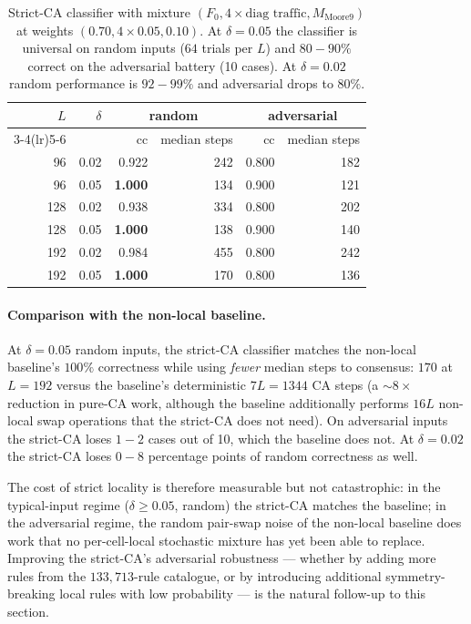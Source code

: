 \documentclass[11pt,a4paper]{article}
\begin{document}
\begin{table}[h]\centering\small
\begin{tabular}{r r r r r r}
\toprule
$L$ & $\delta$
    & \multicolumn{2}{c}{random}
    & \multicolumn{2}{c}{adversarial} \\
\cmidrule(lr){3-4}\cmidrule(lr){5-6}
    &       & cc & median steps
    &       cc & median steps \\
\midrule
96  & 0.02  & 0.922 & 242 & 0.800 & 182 \\
96  & 0.05  & \textbf{1.000} & 134 & 0.900 & 121 \\
128 & 0.02  & 0.938 & 334 & 0.800 & 202 \\
128 & 0.05  & \textbf{1.000} & 138 & 0.900 & 140 \\
192 & 0.02  & 0.984 & 455 & 0.800 & 242 \\
192 & 0.05  & \textbf{1.000} & 170 & 0.800 & 136 \\
\bottomrule
\end{tabular}
\caption{Strict-CA classifier with mixture \((F_0, 4{\times}\text{diag
traffic}, M_{\mathrm{Moore9}})\) at weights \((0.70, 4{\times}0.05,
0.10)\).  At \(\delta = 0.05\) the classifier is universal on random
inputs (\(64\) trials per \(L\)) and \(80{-}90\%\) correct on the
adversarial battery (10 cases).  At \(\delta = 0.02\) random performance
is \(92{-}99\%\) and adversarial drops to \(80\%\).}
\label{tab:strict-ca-validation}
\end{table}

\paragraph{Comparison with the non-local baseline.}
At \(\delta = 0.05\) random inputs, the strict-CA classifier matches
the non-local baseline's \(100\%\) correctness while using
\emph{fewer} median steps to consensus: \(170\) at \(L=192\) versus the
baseline's deterministic \(7L = 1344\) CA steps (a \({\sim}8\times\)
reduction in pure-CA work, although the baseline additionally performs
\(16L\) non-local swap operations that the strict-CA does not need).
On adversarial inputs the strict-CA loses \(1{-}2\) cases out of 10,
which the baseline does not.  At \(\delta = 0.02\) the strict-CA loses
\(0{-}8\) percentage points of random correctness as well.

The cost of strict locality is therefore measurable but not
catastrophic: in the typical-input regime
(\(\delta \geq 0.05\), random) the strict-CA matches the baseline; in
the adversarial regime, the random pair-swap noise of the non-local
baseline does work that no per-cell-local stochastic mixture has yet
been able to replace.  Improving the strict-CA's adversarial
robustness --- whether by adding more rules from the
\(133{,}713\)-rule catalogue, or by introducing additional symmetry-
breaking local rules with low probability --- is the natural
follow-up to this section.
\end{document}
